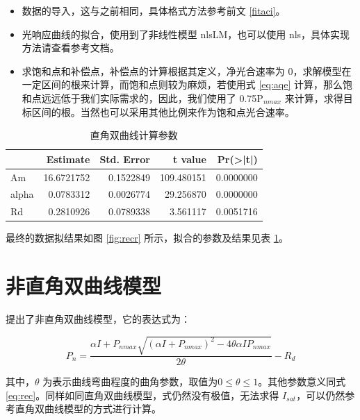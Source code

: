 \documentclass[
]{krantz}
\providecommand{\tightlist}{%
  \setlength{\itemsep}{0pt}\setlength{\parskip}{0pt}}
\begin{document}
\begin{itemize}
\tightlist
\item
  数据的导入，这与之前相同，具体格式方法参考前文 \ref{fitaci}。
\item
  光响应曲线的拟合，使用到了非线性模型 nlsLM，也可以使用 nls，具体实现方法请查看参考文档。
\item
  求饱和点和补偿点，补偿点的计算根据其定义，净光合速率为 0，求解模型在一定区间的根来计算，而饱和点则较为麻烦，若使用式 \eqref{eq:aqe}
  计算，那么饱和点远远低于我们实际需求的，因此，我们使用了 0.75P\(_{nmax}\) 来计算，求得目标区间的根。当然也可以采用其他比例来作为饱和点光合速率。
\end{itemize}

\begin{table}

\caption{\label{tab:rectable}直角双曲线计算参数}
\centering
\begin{tabular}[t]{lrrrr}
\toprule
  & Estimate & Std. Error & t value & Pr(>|t|)\\
\midrule
Am & 16.6721752 & 0.1522849 & 109.480151 & 0.0000000\\
alpha & 0.0783312 & 0.0026774 & 29.256870 & 0.0000000\\
Rd & 0.2810926 & 0.0789338 & 3.561117 & 0.0051716\\
\bottomrule
\end{tabular}
\end{table}

最终的数据拟结果如图 \ref{fig:recr} 所示，拟合的参数及结果见表 \ref{tab:rectable}。

\cleardoublepage

\hypertarget{nonrec-mod}{%
\section{非直角双曲线模型}\label{nonrec-mod}}

\citet{Thornley1976} 提出了非直角双曲线模型，它的表达式为：

\begin{equation}
P_{n} = \frac{\alpha I + P_{nmax} \sqrt{(\alpha I + P_{nmax})^{2} - 4  \theta \alpha I P_{nmax}}}{2 \theta} - R_{d}
\label{eq:nrec}
\end{equation}

其中，\(\theta\) 为表示曲线弯曲程度的曲角参数，取值为\(0\leq \theta \leq 1\)。其他参数意义同式 \eqref{eq:rec}。同样如同直角双曲线模型，式仍然没有极值，无法求得 \(I_{sat}\)，可以仍然参考直角双曲线模型的方式进行计算。
\end{document}
